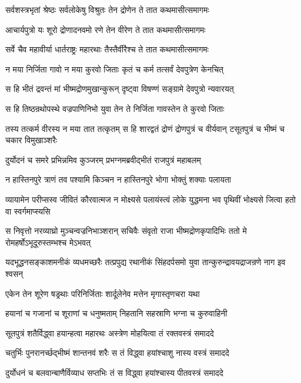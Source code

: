 \twolineshloka
{सर्वशस्त्रभृतां श्रेष्ठः सर्वलोकेषु विश्रुतः}
{तेन द्रोणेन ते तात कथमासीत्समागमः}


\twolineshloka
{आचार्यपुत्रो यः शूरो द्रोणादनवमो रणे}
{तेन वीरेण ते तात कथमासीत्समागमः}


\twolineshloka
{सर्वे चैव महावीर्या धार्तराष्ट्रः महारथाः}
{तैस्तैर्वीरैश्च ते तात कथमासीत्समागमः}




\twolineshloka
{न मया निर्जिता गावो न मया कुरवो जिताः}
{कृतं च कर्म तत्सर्वं देवपुत्रेण केनचित्}


\twolineshloka
{स हि भीतं द्रवन्तं मां भीष्मद्रोणमुखान्कुरून्}
{दृष्ट्वा विषण्णं सङ्ग्रामे देवपुत्रो न्यवारयत्}


\twolineshloka
{स हि तिष्ठन्रथोपस्थे वज्रपाणिनिभो युवा}
{तेन ते निर्जिता गावस्तेन ते कुरवो जिताः}


\threelineshloka
{तस्य तत्कर्म वीरस्य न मया तात तत्कृतम्}
{स हि शारद्वतं द्रोणं द्रोणपुत्रं च वीर्यवान्}
{टसूतपुत्रं च भीष्मं च चकार विमुखाञ्शरैः}


\twolineshloka
{दुर्योदनं च समरे प्रभिन्नमिव कुञ्जरम्}
{प्रभग्नमब्रवीद्भीतं राजपुत्रं महाबलम्}


\twolineshloka
{न हास्तिनपुरे त्राणं तव पश्यामि किञ्चन}
{न हास्तिनपुरे भोगा भोक्तुं शक्याः पलायता}


\threelineshloka
{व्यायामेन परीप्सस्व जीवितं कौरवात्मज}
{न मोक्ष्यसे पलायंस्त्वं लोके युद्धमना भव}
{पृथिवीं भोक्ष्यसे जित्वा हतो वा स्वर्गमाप्स्यसि}


\threelineshloka
{स निवृत्तो नरव्याघ्रो मुञ्चन्वज्रनिभाञ्शरान्}
{सचिवैः संवृतो राजा भीष्मद्रोणकृपादिभिः}
{ततो मे रोमहर्षोऽभूदूरुस्तम्भश्च मेऽभवत्}


\threelineshloka
{यदभूद्धनसङ्काशमनीकं व्यधमच्छरैः}
{तत्प्रपुद्य रथानीकं सिंहदर्पसमो युवा}
{तान्कुरुन्द्रावयद्राजन्रणे नाग इव श्वसन्}


\twolineshloka
{एकेन तेन शूरेण षड्रथाः परिनिर्जिताः}
{शार्दूलेनेव मत्तेन मृगास्तृणचरा यथा}


\twolineshloka
{हयानां च गजानां च शूराणां च धनुष्मताम्}
{निहतानि सहस्राणि भग्ना च कुरुवाहिनी}


\twolineshloka
{सूतपुत्रं शतैर्विद्ध्वा हयान्हत्वा महारथः}
{अस्त्रेण मोहयित्वा तं रक्तवस्त्रं समाददे}


\twolineshloka
{चतुर्भिः पुनरानर्च्छद्भीष्मं शान्तनवं शरैः}
{स तं विद्ध्वा हयांश्चाशु नास्य वस्त्रं समाददे}


\twolineshloka
{दुर्योधनं च बलवान्बाणैर्विव्याध सप्तभिः}
{तं स विद्ध्वा हयांश्चास्य पीतवस्त्रं समाददे}


